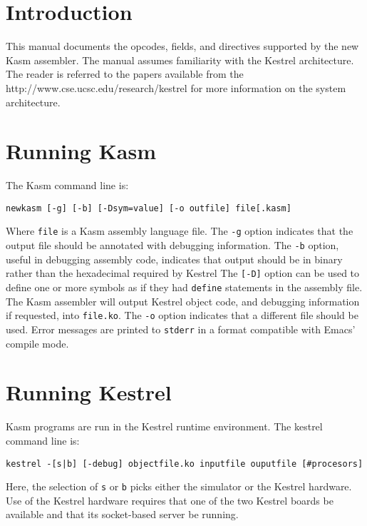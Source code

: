 \clearpage
\tableofcontents
\clearpage

\section{Introduction}

This manual documents the opcodes, fields, and directives supported
by the new {\sc Kasm\/} assembler.  The manual assumes familiarity
with the Kestrel architecture.  The reader is referred to the papers
available from the http://www.cse.ucsc.edu/research/kestrel for more
information on the system architecture.

\section{Running Kasm}

The {\sc Kasm\/} command line is:
\begin{center}
\verb+newkasm [-g] [-b] [-Dsym=value] [-o outfile] file[.kasm]+
\end{center}
Where {\tt file} is a {\sc Kasm\/} assembly language file.  The
{\verb+-g+} option indicates that the output file should be annotated with
debugging information. The \verb+-b+ option, useful in debugging
assembly code, indicates that output 
should be in binary rather than the hexadecimal required by {\sc Kestrel}
The \verb+[-D]+ option can be used to define
one or more symbols as if they had {\tt define} statements in the
assembly file.  The {\sc Kasm\/} assembler will output 
Kestrel object code, and debugging information if requested, into
{\verb+file.ko+}.  The \verb+-o+ option indicates that a different
file should be used.  Error messages are printed to {\tt stderr} in a 
format compatible with Emacs' compile mode.

\section{Running Kestrel}

{\sc Kasm} programs are run in the Kestrel runtime environment.
The {\sc kestrel} command line is:
\begin{center}
 \verb+kestrel -[s|b] [-debug] objectfile.ko inputfile ouputfile [#procesors] +
\end{center}

Here, the selection of {\tt s} or {\tt b} picks either the simulator
or the Kestrel hardware.  Use of the Kestrel hardware requires that
one of the two Kestrel boards be available and that its socket-based
server be running.

